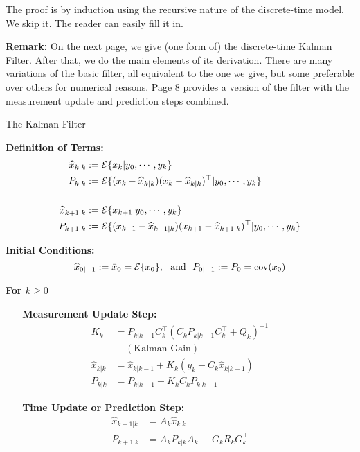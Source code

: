 \documentclass[letterpaper]{article}
\newcommand{\cov}{\mathrm{cov}}
\newcommand{\Expectof}[1]{{\cal E} \{ #1 \}}
\newcommand{\ExpectofGiven}[2]{{\cal E} \{ #1 | #2 \}}
\begin{document}
The proof is by induction using the recursive nature of the discrete-time model. We skip it. The reader can easily fill it in.

\vspace*{2cm}

\textbf{Remark:} On the next page, we give (one form of) the discrete-time Kalman Filter. After that, we do the main elements of its derivation. There are many variations of the basic filter, all equivalent to the one we give, but some preferable over others for numerical reasons. Page 8 provides a version of the filter with the measurement update and prediction steps combined.

 \newpage
 {\Large \bf
\begin{center}
The Kalman Filter
\end{center}
}

\textbf{Definition of Terms:}
\begin{align*}
\widehat{x}_{k|k} &:= \ExpectofGiven{x_k}{y_0, \cdots, y_k}\\
P_{k|k} &:=\ExpectofGiven{(x_k-\widehat{x}_{k|k})(x_k-\widehat{x}_{k|k})^\top}{y_0, \cdots, y_k}\\
& \\
\widehat{x}_{k+1|k} &:= \ExpectofGiven{ x_{k+1} }{ y_0, \cdots, y_k}\\
P_{k+1|k}&:= \ExpectofGiven{(x_{k+1}-\widehat{x}_{k+1|k})(x_{k+1}-\widehat{x}_{k+1|k})^\top}{y_0, \cdots, y_k}\\
\end{align*}

\textbf{Initial Conditions:}
$$\widehat{x}_{0|-1} :=\bar{x}_0 = \Expectof{x_0},~~\mbox{and}~~P_{0|-1}:=P_0=\cov(x_0)  $$

\textbf{For $k \ge 0$}

\textbf{~~~Measurement Update Step:}
\begin{align*}
K_k &= P_{k|k-1}C_k^\top \left(C_k P_{k|k-1} C_k^\top + Q_k\right)^{-1} \\
& ~~~~~(\text{Kalman Gain})\\
\widehat{x}_{k|k} &= \widehat{x}_{k|k-1}  + K_k \left( y_k - C_k \widehat{x}_{k|k-1} \right) \\
P_{k|k} &= P_{k|k-1} - K_k C_k  P_{k|k-1}
\end{align*}

\textbf{~~~Time Update or Prediction Step:}
\begin{align*}
\widehat{x}_{k+1|k} &= A_k \widehat{x}_{k|k}  \\
P_{k+1|k} &= A_k P_{k|k} A_k^\top + G_k R_k G_k^\top
\end{align*}
\end{document}
